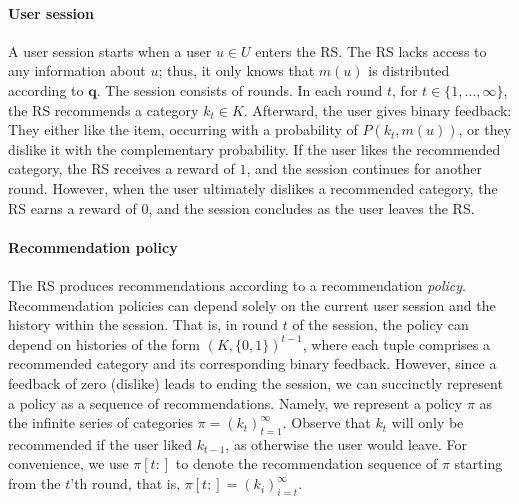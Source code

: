 \paragraph{User session}
A user session starts when a user $u \in U$ enters the RS. The RS lacks access to any information about $u$; thus, it only knows that $m(u)$ is distributed according to $\bm q$. The session consists of rounds. In each round $t$, for $t\in \{1,\dots,\infty\}$, the RS recommends a category $k_t \in K$. Afterward, the user gives binary feedback: They either like the item, occurring with a probability of $P(k_t, m(u))$, or they dislike it with the complementary probability. If the user likes the recommended category, the RS receives a reward of $1$, and the session continues for another round. However, when the user ultimately dislikes a recommended category, the RS earns a reward of $0$, and the session concludes as the user leaves the RS.

\paragraph{Recommendation policy}
The RS produces recommendations according to a recommendation \emph{policy}. Recommendation policies can depend solely on the current user session and the history within the session. That is, in round $t$ of the session, the policy can depend on histories of the form $\left(K,\{0,1\} \right)^{t-1}$, where each tuple comprises a recommended category and its corresponding binary feedback. However, since a feedback of zero (dislike) leads to ending the session, we can succinctly represent a policy as a sequence of recommendations. Namely, we represent a policy $\pi$  as the infinite series of categories $\pi = (k_t)_{t=1}^{\infty}$. 
Observe that $k_t$ will only be recommended if the user liked $k_{t-1}$, as otherwise the user would leave. For convenience, we use $\pi[t:]$ to denote the recommendation sequence of $\pi$ starting from the $t$'th round, that is,  $\pi[t:] = \left( k_{i} \right)_{i=t}^{\infty}$.


